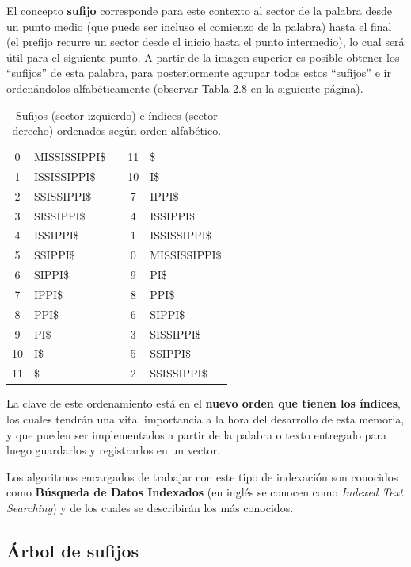 El concepto \textbf{sufijo} corresponde para este contexto al sector de la palabra desde un punto medio (que puede ser incluso el comienzo de la palabra) hasta el final (el prefijo recurre un sector desde el inicio hasta el punto intermedio), lo cual será útil para el siguiente punto.
A partir de la imagen superior es posible obtener los ``sufijos'' de esta palabra, para posteriormente agrupar todos estos ``sufijos'' e ir ordenándolos alfabéticamente (observar Tabla 2.8 en la siguiente página).

\begin{table}[h]
	\centering
	\label{my-label8}
	\begin{tabular}{c l c c l}
		0 & MISSISSIPPI\$ &  & 11 & \$\\
		1 & ISSISSIPPI\$ &  & 10 & I\$\\
		2 & SSISSIPPI\$ &  & 7 & IPPI\$\\
		3 & SISSIPPI\$ &  & 4 & ISSIPPI\$\\
		4 & ISSIPPI\$ &  & 1 & ISSISSIPPI\$\\
		5 & SSIPPI\$ &  & 0 & MISSISSIPPI\$\\
		6 & SIPPI\$ &  & 9 & PI\$\\
		7 & IPPI\$ &  & 8 & PPI\$\\
		8 & PPI\$ &  & 6 & SIPPI\$\\
		9 & PI\$ &  & 3 & SISSIPPI\$\\
		10 & I\$ &  & 5 & SSIPPI\$\\
		11 & \$ &  & 2 & SSISSIPPI\$\\
	\end{tabular}
\caption{Sufijos (sector izquierdo) e índices (sector derecho) ordenados según orden alfabético.}
\end{table}

La clave de este ordenamiento está en el \textbf{nuevo orden que tienen los índices}, los cuales tendrán una vital importancia a la hora del desarrollo de esta memoria, y que pueden ser implementados a partir de la palabra o texto entregado para luego guardarlos y registrarlos en un vector.

Los algoritmos encargados de trabajar con este tipo de indexación son conocidos como \textbf{Búsqueda de Datos Indexados} (en inglés se conocen como \textit{Indexed Text Searching}) y de los cuales se describirán los más conocidos.

\subsection{Árbol de sufijos}

